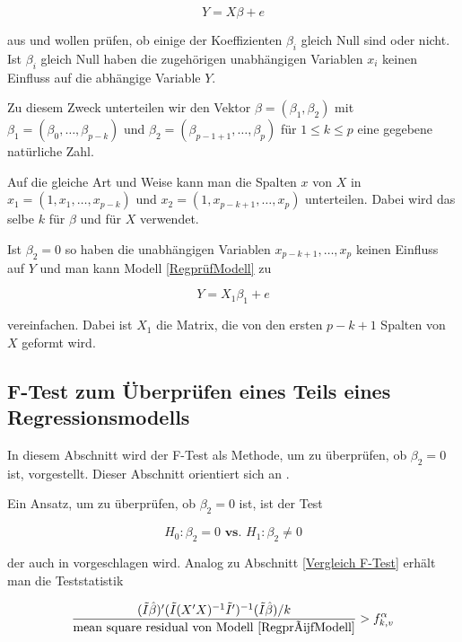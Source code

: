 \documentclass[12pt,a4paper]{article}
\theoremstyle{definition}
\theoremstyle{definition}
\theoremstyle{definition}
\theoremstyle{definition}
\begin{document}
\begin{equation} \label{RegprüfModell}
Y=X \beta + e
\end{equation}

aus und wollen prüfen, ob einige der Koeffizienten $\beta_i$ gleich Null sind oder nicht. Ist $\beta_i$ gleich Null haben die zugehörigen unabhängigen Variablen $x_i$ keinen Einfluss auf die abhängige Variable $Y$.  

Zu diesem Zweck unterteilen wir den Vektor $\beta=(\beta_1,\beta_2)$ mit $\beta_1=(\beta_0, \ldots, \beta_{p-k})$ und $\beta_2=(\beta_{p-1+1}, \ldots, \beta_{p})$ für $1 \leq k \leq p$ eine gegebene natürliche Zahl. 

Auf die gleiche Art und Weise kann man die Spalten $x$ von $X$ in $x_1=(1,x_1, \ldots, x_{p-k})$ und $x_2=(1,x_{p-k+1}, \ldots, x_{p})$ unterteilen. Dabei wird das selbe $k$ für $\beta$ und für $X$ verwendet.

Ist $\beta_2=0$ so haben die unabhängigen Variablen $x_{p-k+1}, \ldots, x_p$ keinen Einfluss auf $Y$ und man kann Modell \eqref{RegprüfModell} zu 

\begin{equation}
Y=X_1 \beta_1 + e
\end{equation}

vereinfachen. Dabei ist $X_1$ die Matrix, die von den ersten $p-k+1$ Spalten von $X$ geformt wird.

\subsection{F-Test zum Überprüfen eines Teils eines Regressionsmodells}
\label{F-Test-Teil}
In diesem Abschnitt wird der F-Test als Methode, um zu überprüfen, ob $\beta_2=0$ ist, vorgestellt. Dieser Abschnitt orientiert sich an \cite[100-102]{Liu64}.

Ein Ansatz, um zu überprüfen, ob $\beta_2=0$ ist, ist der Test 

\begin{equation} \label{Test_prüfen}
H_{0} : \beta_{2} = 0  \textbf{ vs. }  H_{1} : \beta_{2} \neq 0
\end{equation}

der auch in \cite{Draper98} vorgeschlagen wird. Analog zu Abschnitt \ref{Vergleich F-Test} erhält man die Teststatistik

\begin{equation*}
\frac{(\tilde{I}\hat{\beta})'(\tilde{I}(X'X)^{-1}\tilde{I}')^{-1}(\tilde{I}\hat{\beta})/k}{\text{mean square residual von Modell \eqref{RegprüfModell}}} > f^{\alpha}_{k,v}
\end{equation*}
\end{document}
